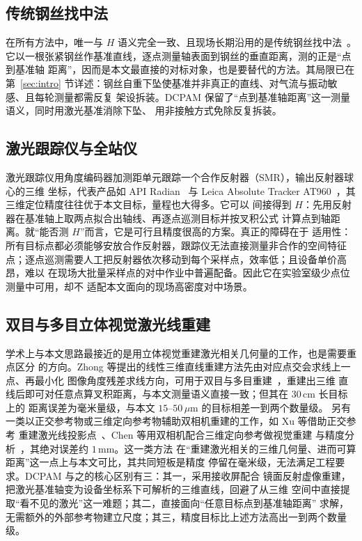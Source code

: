 \subsection{传统钢丝找中法}

在所有方法中，唯一与 $H$ 语义完全一致、且现场长期沿用的是传统钢丝找中法~\cite{wire_alignment}。
它以一根张紧钢丝作基准直线，逐点测量轴表面到钢丝的垂直距离，测的正是“点到基准轴
距离”，因而是本文最直接的对标对象，也是要替代的方法。其局限已在第~\ref{sec:intro}
节详述：钢丝自重下坠使基准并非真正的直线、对气流与振动敏感、且每轮测量都需反复
架设拆装。DCPAM 保留了“点到基准轴距离”这一测量语义，同时用激光基准消除下坠、
用非接触方式免除反复拆装。

\subsection{激光跟踪仪与全站仪}

激光跟踪仪用角度编码器加测距单元跟踪一个合作反射器（SMR），输出反射器球心的三维
坐标，代表产品如 API Radian~\cite{api_radian} 与 Leica Absolute Tracker
AT960~\cite{leica_at960}，其三维定位精度往往优于本文目标，量程也大得多。它可以
间接得到 $H$：先用反射器在基准轴上取两点拟合出轴线、再逐点巡测目标并按叉积公式
计算点到轴距离。就“能否测 $H$”而言，它是可行且精度很高的方案。真正的障碍在于
适用性：所有目标点都必须能够安放合作反射器，跟踪仪无法直接测量非合作的空间特征
点；逐点巡测需要人工把反射器依次移动到每个采样点，效率低；且设备单价高昂，难以
在现场大批量采样点的对中作业中普遍配备。因此它在实验室级少点位测量中可用，却不
适配本文面向的现场高密度对中场景。

\subsection{双目与多目立体视觉激光线重建}

学术上与本文思路最接近的是用立体视觉重建激光相关几何量的工作，也是需要重点区分
的方向。Zhong 等提出的线性三维直线重建方法先由对应点交会求线上一点、再最小化
图像角度残差求线方向，可用于双目与多目重建~\cite{zhong2021line3d}，重建出三维
直线后即可对任意点算叉积距离，与本文测量语义直接一致；但其在 30\,cm 长目标上的
距离误差为毫米量级，与本文 $15$--$50\,\mu\mathrm{m}$ 的目标相差一到两个数量级。
另有一类以正交参考物或三维定向参考物辅助双相机重建的工作，如 Xu 等借助正交参考
重建激光线投影点~\cite{xu2017ortho}、Chen 等用双相机配合三维定向参考做视觉重建
与精度分析~\cite{chen2021vision2cam}，其绝对误差约 $1\,\mathrm{mm}$。这一类方法
在“重建激光相关的三维几何量、进而可算距离”这一点上与本文可比，其共同短板是精度
停留在毫米级，无法满足工程要求。DCPAM 与之的核心区别有三：其一，采用接收屏配合
镜面反射虚像重建，把激光基准轴变为设备坐标系下可解析的三维直线，回避了从三维
空间中直接提取“看不见的激光”这一难题；其二，直接面向“任意目标点到基准轴距离”
求解，无需额外的外部参考物建立尺度；其三，精度目标比上述方法高出一到两个数量级。

